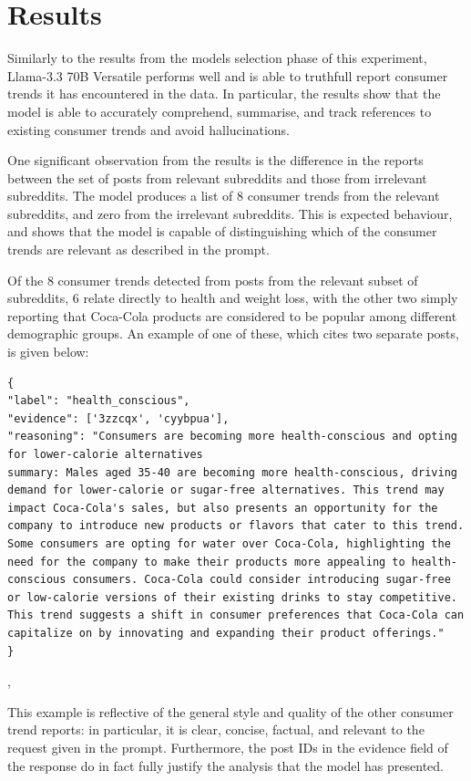 \documentclass{report}
\begin{document}
\section{Results}

Similarly to the results from the models selection phase of this experiment, Llama-3.3 70B Versatile performs well and is able to truthfull report consumer trends it has encountered in the data. In particular, the results show that the model is able to accurately comprehend, summarise, and track references to existing consumer trends and avoid hallucinations.

One significant observation from the results is the difference in the reports between the set of posts from relevant subreddits and those from irrelevant subreddits. The model produces a list of 8 consumer trends from the relevant subreddits, and zero from the irrelevant subreddits. This is expected behaviour, and shows that the model is capable of distinguishing which of the consumer trends are relevant as described in the prompt.

Of the 8 consumer trends detected from posts from the relevant subset of subreddits, 6 relate directly to health and weight loss, with the other two simply reporting that Coca-Cola products are considered to be popular among different demographic groups. An example of one of these, which cites two separate posts, is given below:
\begin{listing}[H]
\centering
\begin{minipage}{\linewidth}
\begin{lstlisting}[style=promptstyle]
{
"label": "health_conscious",
"evidence": ['3zzcqx', 'cyybpua'],
"reasoning": "Consumers are becoming more health-conscious and opting for lower-calorie alternatives
summary: Males aged 35-40 are becoming more health-conscious, driving demand for lower-calorie or sugar-free alternatives. This trend may impact Coca-Cola's sales, but also presents an opportunity for the company to introduce new products or flavors that cater to this trend. Some consumers are opting for water over Coca-Cola, highlighting the need for the company to make their products more appealing to health-conscious consumers. Coca-Cola could consider introducing sugar-free or low-calorie versions of their existing drinks to stay competitive. This trend suggests a shift in consumer preferences that Coca-Cola can capitalize on by innovating and expanding their product offerings."
}
\end{lstlisting}
\end{minipage}
\caption{Example of a consumer trend report, based on posts from r/loseit and r/nutrition, generated by Llama-3.3 70B Versatile},
\label{lst:expt2-report-example}
\end{listing}
This example is reflective of the general style and quality of the other consumer trend reports: in particular, it is clear, concise, factual, and relevant to the request given in the prompt. Furthermore, the post IDs in the evidence field of the response do in fact fully justify the analysis that the model has presented.
\end{document}
